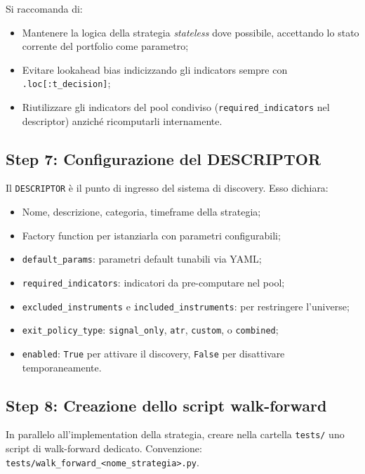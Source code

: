Si raccomanda di:

\begin{itemize}
  \item Mantenere la logica della strategia \emph{stateless} dove possibile, accettando lo stato corrente del portfolio come parametro;
  \item Evitare lookahead bias indicizzando gli indicators sempre con \texttt{.loc[:t\_decision]};
  \item Riutilizzare gli indicators del pool condiviso (\texttt{required\_indicators} nel descriptor) anziché ricomputarli internamente.
\end{itemize}

\subsection{Step 7: Configurazione del DESCRIPTOR}

Il \texttt{DESCRIPTOR} è il punto di ingresso del sistema di discovery. Esso dichiara:

\begin{itemize}
  \item Nome, descrizione, categoria, timeframe della strategia;
  \item Factory function per istanziarla con parametri configurabili;
  \item \texttt{default\_params}: parametri default tunabili via YAML;
  \item \texttt{required\_indicators}: indicatori da pre-computare nel pool;
  \item \texttt{excluded\_instruments} e \texttt{included\_instruments}: per restringere l'universe;
  \item \texttt{exit\_policy\_type}: \texttt{signal\_only}, \texttt{atr}, \texttt{custom}, o \texttt{combined};
  \item \texttt{enabled}: \texttt{True} per attivare il discovery, \texttt{False} per disattivare temporaneamente.
\end{itemize}

\subsection{Step 8: Creazione dello script walk-forward}

In parallelo all'implementation della strategia, creare nella cartella \texttt{tests/} uno script di walk-forward dedicato. Convenzione: \texttt{tests/walk\_forward\_<nome\_strategia>.py}.

